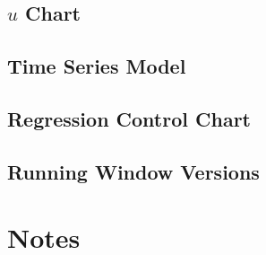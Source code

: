 \subsection{$u$ Chart}
\subsection{Time Series Model}
\subsection{Regression Control Chart}
\subsection{Running Window Versions}




\section{Notes}


